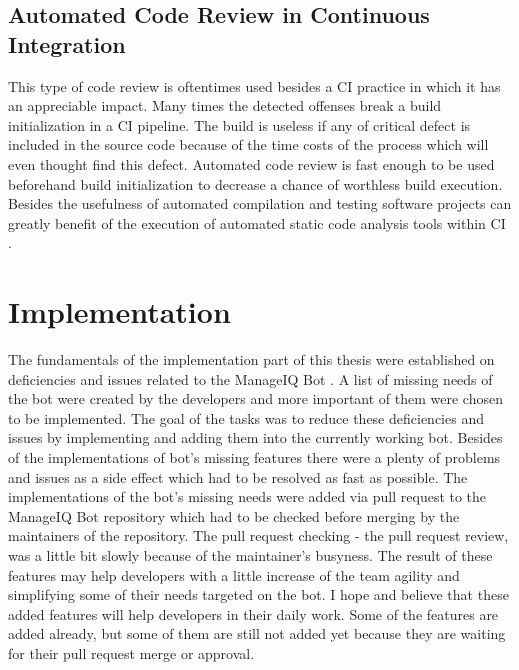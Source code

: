 \section{Automated Code Review in Continuous Integration}

This type of code review is oftentimes used besides a CI practice in which it has an appreciable impact. Many times the detected offenses break a build initialization in a CI pipeline. The build is useless if any of critical defect is included in the source code because of the time costs of the process which will even thought find this defect. Automated code review is fast enough to be used beforehand build initialization to decrease a chance of worthless build execution. Besides the usefulness of automated compilation and testing software projects can greatly benefit of the execution of automated static code analysis tools within CI \cite{SCA_in_CI}.\\

\chapter{Implementation}\label{chapter:implementation}

The fundamentals of the implementation part of this thesis were established on deficiencies and issues related to the ManageIQ Bot \cite{MIQBOT}. A list of missing needs of the bot were created by the developers and more important of them were chosen to be implemented. The goal of the tasks was to reduce these deficiencies and issues by implementing and adding them into the currently working bot. Besides of the implementations of bot's missing features there were a plenty of problems and issues as a side effect which had to be resolved as fast as possible. The implementations of the bot's missing needs were added via pull request to the ManageIQ Bot repository which had to be checked before merging by the maintainers of the repository. The pull request checking - the pull request review, was a little bit slowly because of the maintainer's busyness. The result of these features may help developers with a little increase of the team agility and simplifying some of their needs targeted on the bot. I hope and believe that these added features will help developers in their daily work. Some of the features are added already, but some of them are still not added yet because they are waiting for their pull request merge or approval.

